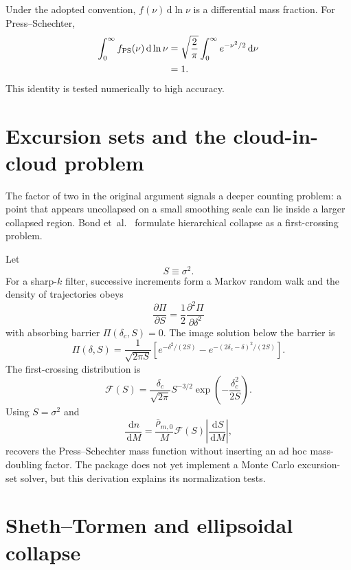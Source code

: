 \documentclass[11pt]{article}
\newcommand{\dd}{\,\mathrm d}
\newcommand{\rhobar}{\bar{\rho}_{m,0}}
\begin{document}
Under the adopted convention, $f(\nu)\dd\ln\nu$ is a differential mass fraction. For Press--Schechter,
\begin{align}
\int_0^\infty f_{\rm PS}(\nu)\dd\ln\nu
&=\sqrt{\frac{2}{\pi}}\int_0^\infty e^{-\nu^2/2}\dd\nu\\
&=1.
\end{align}
This identity is tested numerically to high accuracy.

\section{Excursion sets and the cloud-in-cloud problem}

The factor of two in the original argument signals a deeper counting problem: a point that appears uncollapsed on a small smoothing scale can lie inside a larger collapsed region. Bond et~al.\ \cite{BondEtAl1991} formulate hierarchical collapse as a first-crossing problem.

Let
\begin{equation}
S\equiv\sigma^2.
\end{equation}
For a sharp-$k$ filter, successive increments form a Markov random walk and the density of trajectories obeys
\begin{equation}
\frac{\partial\Pi}{\partial S}=\frac{1}{2}\frac{\partial^2\Pi}{\partial\delta^2}
\end{equation}
with absorbing barrier $\Pi(\delta_c,S)=0$. The image solution below the barrier is
\begin{equation}
\Pi(\delta,S)=\frac{1}{\sqrt{2\pi S}}
\left[
 e^{-\delta^2/(2S)}-e^{-(2\delta_c-\delta)^2/(2S)}
\right].
\end{equation}
The first-crossing distribution is
\begin{equation}
\boxed{
\mathcal F(S)=\frac{\delta_c}{\sqrt{2\pi}}S^{-3/2}
\exp\left(-\frac{\delta_c^2}{2S}\right).
}
\end{equation}
Using $S=\sigma^2$ and
\begin{equation}
\frac{\dd n}{\dd M}=\frac{\rhobar}{M}\mathcal F(S)\left|\frac{\dd S}{\dd M}\right|,
\end{equation}
recovers the Press--Schechter mass function without inserting an ad hoc mass-doubling factor. The package does not yet implement a Monte Carlo excursion-set solver, but this derivation explains its normalization tests.

\section{Sheth--Tormen and ellipsoidal collapse}
\end{document}
